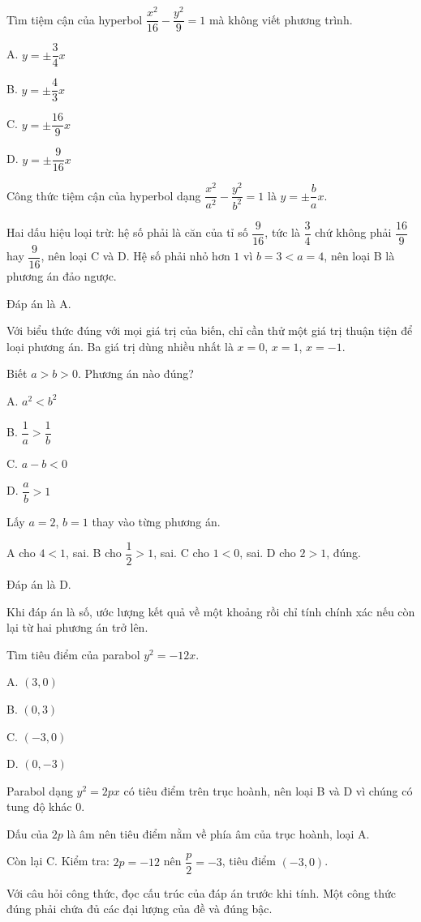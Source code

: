 \documentclass[11pt, a4paper]{article}
\begin{document}
\begin{vidu}[{9}]
Tìm tiệm cận của hyperbol $\dfrac{x^2}{16} - \dfrac{y^2}{9} = 1$ mà không viết phương trình.

A. $y = \pm\dfrac{3}{4}x$

B. $y = \pm\dfrac{4}{3}x$

C. $y = \pm\dfrac{16}{9}x$

D. $y = \pm\dfrac{9}{16}x$

Công thức tiệm cận của hyperbol dạng $\dfrac{x^2}{a^2} - \dfrac{y^2}{b^2} = 1$ là $y = \pm\dfrac{b}{a}x$.

Hai dấu hiệu loại trừ: hệ số phải là căn của tỉ số $\dfrac{9}{16}$, tức là $\dfrac{3}{4}$ chứ không phải $\dfrac{16}{9}$ hay $\dfrac{9}{16}$, nên loại C và D. Hệ số phải nhỏ hơn $1$ vì $b = 3 < a = 4$, nên loại B là phương án đảo ngược.

Đáp án là A.

\begin{dinhly}
Với biểu thức đúng với mọi giá trị của biến, chỉ cần thử một giá trị thuận tiện để loại phương án. Ba giá trị dùng nhiều nhất là $x = 0$, $x = 1$, $x = -1$.
\end{dinhly}
\end{vidu}
\begin{vidu}[{10}]
Biết $a > b > 0$. Phương án nào đúng?

A. $a^2 < b^2$

B. $\dfrac{1}{a} > \dfrac{1}{b}$

C. $a - b < 0$

D. $\dfrac{a}{b} > 1$

Lấy $a = 2$, $b = 1$ thay vào từng phương án.

A cho $4 < 1$, sai. B cho $\dfrac{1}{2} > 1$, sai. C cho $1 < 0$, sai. D cho $2 > 1$, đúng.

Đáp án là D.

\begin{dinhly}
Khi đáp án là số, ước lượng kết quả về một khoảng rồi chỉ tính chính xác nếu còn lại từ hai phương án trở lên.
\end{dinhly}
\end{vidu}
\begin{vidu}[{11}]
Tìm tiêu điểm của parabol $y^2 = -12x$.

A. $(3, 0)$

B. $(0, 3)$

C. $(-3, 0)$

D. $(0, -3)$

Parabol dạng $y^2 = 2px$ có tiêu điểm trên trục hoành, nên loại B và D vì chúng có tung độ khác $0$.

Dấu của $2p$ là âm nên tiêu điểm nằm về phía âm của trục hoành, loại A.

Còn lại C. Kiểm tra: $2p = -12$ nên $\dfrac{p}{2} = -3$, tiêu điểm $(-3, 0)$.

\begin{dinhly}
Với câu hỏi công thức, đọc cấu trúc của đáp án trước khi tính. Một công thức đúng phải chứa đủ các đại lượng của đề và đúng bậc.
\end{dinhly}
\end{vidu}
\end{document}
